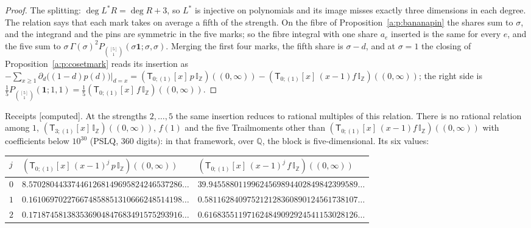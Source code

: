 \documentclass[11pt]{article}
\newcommand{\one}{\mathbf 1}
\newcommand{\sT}{\mathsf T}
\newcommand{\IZ}{\mathbb I_{\mathbb Z}}
\newcommand{\Tx}[3]{(\sT_{#1;(1)}[x]\,#2)((#3,\infty))}
\theoremstyle{plain}
\theoremstyle{definition}
\theoremstyle{remark}
\newcommand{\computed}{\textup{[computed]}}
\begin{document}
\begin{proof}
The splitting: $\deg L^\ast R=\deg R+3$, so $L^\ast$ is injective on polynomials and its image misses exactly three dimensions in each degree. The relation says that each mark takes on average a fifth of the strength. On the fibre of Proposition~\ref{a:p:bananapin} the shares sum to $\sigma$, and the integrand and the pins are symmetric in the five marks; so the fibre integral with one share $a_e$ inserted is the same for every $e$, and the five sum to $\sigma\,\Gamma(\sigma)^2P_{\binom{[5]}1}(\sigma\one;\sigma,\sigma)$. Merging the first four marks, the fifth share is $\sigma-d$, and at $\sigma=1$ the closing of Proposition~\ref{a:p:cosetmark} reads its insertion as $-\sum_{x\ge1}\partial_d\big((1-d)p(d)\big)\big|_{d=x}=\Tx{0}{p\,\IZ}{0}-\Tx{0}{(x-1)f\,\IZ}{0}$; the right side is $\frac15P_{\binom{[5]}1}(\one;1,1)=\frac15\Tx{0}{f\,\IZ}{0}$.
\end{proof}

\noindent Receipts \computed. At the strengths $2,\dots,5$ the same insertion reduces to rational multiples of this relation. There is no rational relation among $1$, $\Tx{3}{\IZ}{0}$, $f(1)$ and the five Trailmoments other than $\Tx{0}{(x-1)f\,\IZ}{0}$ with coefficients below $10^{30}$ (PSLQ, $360$ digits): in that framework, over $\mathbb Q$, the block is five-dimensional. Its six values:
\begin{center}
\small
\begin{tabular}{@{}lll@{}}
\toprule
$j$ & $\Tx{0}{(x-1)^j\,p\,\IZ}{0}$ & $\Tx{0}{(x-1)^j\,f\,\IZ}{0}$\\ \midrule
$0$ & $8.570280443374461268149695824246537286\ldots$ & $39.94558801199624569894402849842399589\ldots$\\
$1$ & $0.161069702276674858851310666248514198\ldots$ & $0.581162840975212128360890124561738107\ldots$\\
$2$ & $0.171874581383536904847683491575293916\ldots$ & $0.616835511971624849092924541153028126\ldots$\\
\bottomrule
\end{tabular}
\end{center}
\end{document}
